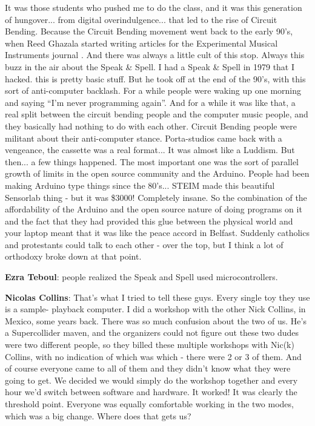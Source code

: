 It was those students who pushed me to do the class, and it was this generation of hungover... from digital overindulgence... that led to the rise of Circuit Bending. Because the Circuit Bending movement went back to the early 90’s, when Reed Ghazala started writing articles for the Experimental Musical Instruments journal \citep{emi} . And there was always a little cult of this stop. Always this buzz in the air about the Speak & Spell. I had a Speak \& Spell in 1979 that I hacked. this is pretty basic stuff. But he took off at the end of the 90’s, with this sort of anti-computer backlash. For a while people were waking up one morning and saying ``I’m never programming again''. And for a while it was like that, a real split between the circuit bending people and the computer music people, and they basically had nothing to do with each other. Circuit Bending people were militant about their anti-computer stance. Porta-studios came back with a vengeance, the cassette was a real format... It was almost like a Luddism. But then... a few things happened. The most important one was the sort of parallel growth of limits in the open source community and the Arduino.   People had been making Arduino type things since the 80’s... STEIM made this beautiful Sensorlab thing - but it was \$3000! Completely insane. So the combination of the affordability of the Arduino and the open source nature of doing programs on it and the fact that they had provided this glue between the physical world and your laptop meant that it was like the peace accord in Belfast. Suddenly catholics and protestants could talk to each other - over the top, but I think a lot of orthodoxy broke down at that point.

\textbf{Ezra Teboul}: people realized the Speak and Spell used microcontrollers.
					
\textbf{Nicolas Collins}: That’s what I tried to tell these guys. Every single toy they use is a sample- playback computer. I did a workshop with the other Nick Collins, in Mexico, some years back. There was so much confusion about the two of us. He’s a Supercollider maven, and the organizers could not figure out these two dudes were two different people, so they billed these multiple workshops with Nic(k) Collins, with no indication of which was which - there were 2 or 3 of them. And of course everyone came to all of them and they didn’t know what they were going to get. We decided we would simply do the workshop together and every hour we’d switch between software and hardware. It worked! It was clearly the threshold point. Everyone was equally comfortable working in the two modes, which was a big change. Where does that gets us?
					
